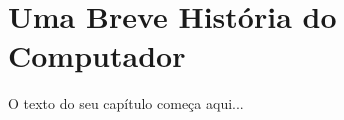 
\chapter{Uma Breve História do Computador}
\label{cap:historia-computador}

O texto do seu capítulo começa aqui...